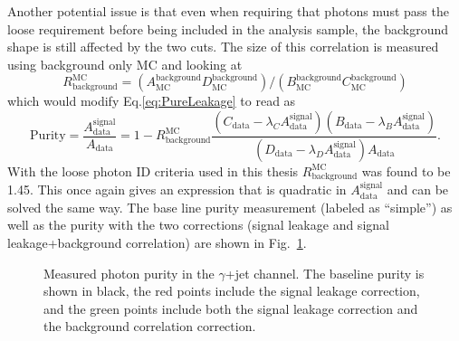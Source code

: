 Another potential issue is that even when requiring that photons must pass the loose requirement before being included in the analysis sample, the background shape is still affected by the two cuts.  
The size of this correlation is measured using background only MC and looking at 
\begin{equation}
 R^{\mathrm{MC}}_{\mathrm {background}}= \left(A_{\mathrm{MC}}^{\mathrm{background}}D_{\mathrm{MC}}^{\mathrm{background}}\right)/\left(B_{\mathrm{MC}}^{\mathrm{background}}C_{\mathrm{MC}}^{\mathrm{background}}\right) 
\end{equation} 
which would modify Eq.\ref{eq:PureLeakage} to read as
\begin{equation}
  \mathrm{Purity} = \frac{A_{\mathrm{data}}^{\mathrm{signal}}}{A_{\mathrm{data}}} = 1-R^{\mathrm{MC}}_{\mathrm {background}}\frac{\left(C_{\mathrm{data}}-\lambda_CA_{\mathrm{data}}^{\mathrm{signal}}\right)\left(B_{\mathrm{data}}-\lambda_BA_{\mathrm{data}}^{\mathrm{signal}}\right)}{\left(D_{\mathrm{data}}-\lambda_DA_{\mathrm{data}}^{\mathrm{signal}}\right)A_{\mathrm{data}}}.  
\end{equation}
With the loose photon ID criteria used in this thesis $R^{\mathrm{MC}}_{\mathrm {background}}$ was found to be 1.45.  
This once again gives an expression that is quadratic in $A_{\mathrm{data}}^{\mathrm{signal}}$ and can be solved the same way.  
The base line purity measurement (labeled as ``simple'') as well as the purity with the two corrections (signal leakage and signal leakage+background correlation) are shown in Fig.~\ref{fig:PurityMeas}.  
\begin{figure}[!ht]
 \begin{center}
 \end{center}
 \caption[$\gamma$+jet purity measurement]
 {\small Measured photon purity in the $\gamma$+jet channel.  The baseline purity is shown in black, the red points include the signal leakage correction, and the green points include both the signal leakage correction and the background correlation correction. }
 \label{fig:PurityMeas}
\end{figure}

